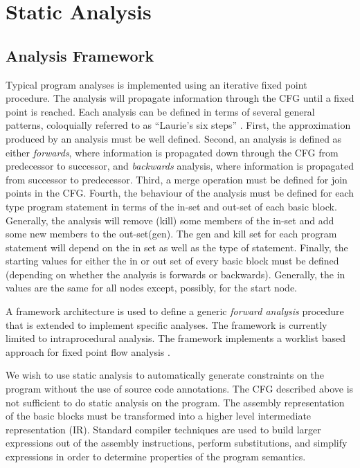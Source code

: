 \section{Static Analysis}

\subsection{Analysis Framework}

	Typical program analyses is implemented using an iterative fixed point procedure. 
	The analysis will propagate information through the CFG until a fixed point is reached. Each analysis can be defined in terms of several general patterns, coloquially referred to as ``Laurie's six steps'' \cite{lauriesteps}. 
	First, the approximation produced by an analysis must be well defined. 
	Second, an analysis is defined as either \emph{forwards}, where information is propagated down through the CFG from predecessor to successor, and \emph{backwards} analysis, where information is propagated from successor to predecessor. 
	Third, a merge operation must be defined for join points in the CFG. 
	Fourth, the behaviour of the analysis must be defined for each type program statement in terms of the in-set and out-set of each basic block. Generally, the analysis will remove (kill) some members of the in-set and add some new members to the out-set(gen). The gen and kill set for each program statement will depend on the in set as well as the type of statement. 
	Finally, the starting values for either the in or out set of every basic block must be defined (depending on whether the analysis is forwards or backwards). Generally, the in values are the same for all nodes except, possibly, for the start node.

	A framework architecture is used to define a generic \emph{forward analysis} procedure that is extended to implement specific analyses. The framework is currently limited to intraprocedural analysis. The framework implements a worklist based approach for fixed point flow analysis \cite{andrew2002modern}.

	We wish to use static analysis to automatically generate constraints on the program without the use of source code annotations.
	The CFG described above is not sufficient to do static analysis on the program. 
	The assembly representation of the basic blocks must be transformed into a higher level intermediate representation (IR). 
	Standard compiler techniques \cite{andrew2002modern} are used to build larger expressions out of the assembly instructions, perform substitutions, and simplify expressions in order to determine properties of the program semantics. 

